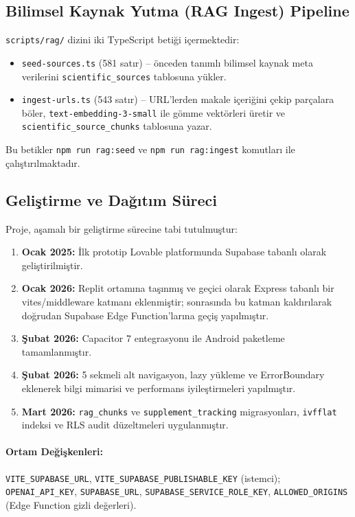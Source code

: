\subsection{Bilimsel Kaynak Yutma (RAG Ingest) Pipeline}

\texttt{scripts/rag/} dizini iki TypeScript betiği içermektedir:
\begin{itemize}
    \item \texttt{seed-sources.ts} (581 satır) -- önceden tanımlı bilimsel kaynak meta verilerini \texttt{scientific\_sources} tablosuna yükler.
    \item \texttt{ingest-urls.ts} (543 satır) -- URL'lerden makale içeriğini çekip parçalara böler, \texttt{text-embedding-3-small} ile gömme vektörleri üretir ve \texttt{scientific\_source\_chunks} tablosuna yazar.
\end{itemize}
Bu betikler \texttt{npm run rag:seed} ve \texttt{npm run rag:ingest} komutları ile çalıştırılmaktadır.

\subsection{Geliştirme ve Dağıtım Süreci}

Proje, aşamalı bir geliştirme sürecine tabi tutulmuştur:

\begin{enumerate}
    \item \textbf{Ocak 2025:} İlk prototip Lovable platformunda Supabase tabanlı olarak geliştirilmiştir.
    \item \textbf{Ocak 2026:} Replit ortamına taşınmış ve geçici olarak Express tabanlı bir vites/middleware katmanı eklenmiştir; sonrasında bu katman kaldırılarak doğrudan Supabase Edge Function'larına geçiş yapılmıştır.
    \item \textbf{Şubat 2026:} Capacitor 7 entegrasyonu ile Android paketleme tamamlanmıştır.
    \item \textbf{Şubat 2026:} 5 sekmeli alt navigasyon, lazy yükleme ve ErrorBoundary eklenerek bilgi mimarisi ve performans iyileştirmeleri yapılmıştır.
    \item \textbf{Mart 2026:} \texttt{rag\_chunks} ve \texttt{supplement\_tracking} migrasyonları, \texttt{ivfflat} indeksi ve RLS audit düzeltmeleri uygulanmıştır.
\end{enumerate}

\paragraph{Ortam Değişkenleri:}
\texttt{VITE\_SUPABASE\_URL}, \texttt{VITE\_SUPABASE\_PUBLISHABLE\_KEY} (istemci); \texttt{OPENAI\_API\_KEY}, \texttt{SUPABASE\_URL}, \texttt{SUPABASE\_SERVICE\_ROLE\_KEY}, \texttt{ALLOWED\_ORIGINS} (Edge Function gizli değerleri).

